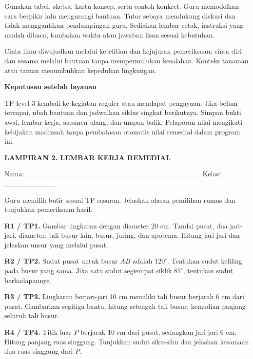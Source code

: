 \documentclass[11pt,a4paper]{article}
\begin{document}
Gunakan tabel, sketsa, kartu konsep, serta contoh konkret. Guru memodelkan cara berpikir lalu mengurangi bantuan. Tutor sebaya mendukung diskusi dan tidak menggantikan pendampingan guru. Sediakan lembar cetak, instruksi yang mudah dibaca, tambahan waktu atau jawaban lisan sesuai kebutuhan.\par\medskip
{\small Cinta ilmu diwujudkan melalui ketelitian dan kejujuran pemeriksaan; cinta diri dan sesama melalui bantuan tanpa mempermalukan kesalahan. Konteks tanaman atau taman menumbuhkan kepedulian lingkungan.\par}\medskip
\par\medskip\noindent\textbf{Keputusan setelah layanan}\par\smallskip
{\small TP level 3 kembali ke kegiatan reguler atau mendapat pengayaan. Jika belum tercapai, ubah bantuan dan jadwalkan siklus singkat berikutnya. Simpan bukti awal, lembar kerja, asesmen ulang, dan umpan balik. Pelaporan nilai mengikuti kebijakan madrasah tanpa pembatasan otomatis nilai remedial dalam program ini.\par}\medskip
\clearpage
\begin{center}\bfseries\large LAMPIRAN 2. LEMBAR KERJA REMEDIAL\end{center}\medskip
{\small Nama: \_\_\_\_\_\_\_\_\_\_\_\_\_\_\_\_\_\_\_\_\_\_\_\_\_\_\_\_\_\_\_\_\_\_  Kelas: \_\_\_\_\_\_\_\_\_\_\par}\medskip
{\small Guru memilih butir sesuai TP sasaran. Jelaskan alasan pemilihan rumus dan tunjukkan pemeriksaan hasil.\par}\medskip
\noindent\textbf{R1 / TP1.} Gambar lingkaran dengan diameter 20 cm. Tandai pusat, dua jari-jari, diameter, tali busur lain, busur, juring, dan apotema. Hitung jari-jari dan jelaskan unsur yang melalui pusat.\par\vspace{10mm}
\noindent\textbf{R2 / TP2.} Sudut pusat untuk busur \(AB\) adalah \(120^\circ\). Tentukan sudut keliling pada busur yang sama. Jika satu sudut segiempat siklik \(85^\circ\), tentukan sudut berhadapannya.\par\vspace{10mm}
\noindent\textbf{R3 / TP3.} Lingkaran berjari-jari 10 cm memiliki tali busur berjarak 6 cm dari pusat. Gambarkan segitiga bantu, hitung setengah tali busur, kemudian panjang seluruh tali busur.\par\vspace{10mm}
\noindent\textbf{R4 / TP4.} Titik luar \(P\) berjarak 10 cm dari pusat, sedangkan jari-jari 6 cm. Hitung panjang ruas singgung. Tunjukkan sudut siku-siku dan jelaskan kesamaan dua ruas singgung dari \(P\).\par\vspace{10mm}
\end{document}
